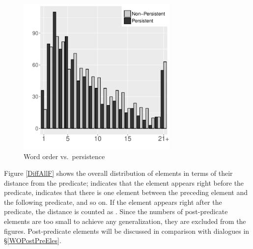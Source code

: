 \begin{figure}
	\includegraphics[width=0.7\textwidth]{figure/DEPositionPer.pdf}
	\caption{Word order vs.\ persistence}
	\label{DEPositionPerF}
\end{figure}


Figure \ref{DiffAllF} shows the overall distribution of elements in terms of their distance from the predicate;
 indicates that the element appears right before the predicate,
 indicates that there is one element between the preceding element and the following predicate, and so on.
If the element appears right after the predicate,
the distance is counted as .
Since the numbers of post-predicate elements are too small to achieve any generalization,
they are excluded from the figures.
Post-predicate elements will be discussed in comparison with dialogues
in \S \ref{WOPostPreEles}.

